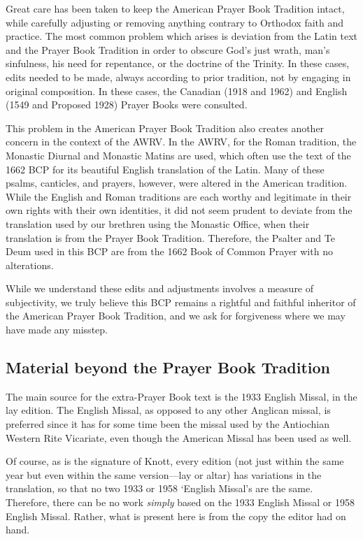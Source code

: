 Great care has been taken to keep the American Prayer Book Tradition intact, while carefully adjusting or removing anything contrary to Orthodox faith and practice. The most common problem which arises is deviation from the Latin text and the Prayer Book Tradition in order to obscure God's just wrath, man's sinfulness, his need for repentance, or the doctrine of the Trinity. In these cases, edits needed to be made, always according to prior tradition, not by engaging in original composition. In these cases, the Canadian (1918 and 1962) and English (1549 and Proposed 1928) Prayer Books were consulted.

This problem in the American Prayer Book Tradition also creates another concern in the context of the AWRV. In the AWRV, for the Roman tradition, the Monastic Diurnal and Monastic Matins are used, which often use the text of the 1662 BCP for its beautiful English translation of the Latin. Many of these psalms, canticles, and prayers, however, were altered in the American tradition. While the English and Roman traditions are each worthy and legitimate in their own rights with their own identities, it did not seem prudent to deviate from the translation used by our brethren using the Monastic Office, when their translation is from the Prayer Book Tradition. Therefore, the Psalter and Te Deum used in this BCP are from the 1662 Book of Common Prayer with no alterations.

While we understand these edits and adjustments involves a measure of subjectivity, we truly believe this BCP remains a rightful and faithful inheritor of the American Prayer Book Tradition, and we ask for forgiveness where we may have made any misstep.

\subsection{Material beyond the Prayer Book Tradition}\par\noindent
The main source for the extra-Prayer Book text is the 1933 English Missal, in the lay edition. The English Missal, as opposed to any other Anglican missal, is preferred since it has for some time been the missal used by the Antiochian Western Rite Vicariate, even though the American Missal has been used as well.

Of course, as is the signature of Knott, every edition (not just within the same year but even within the same version---lay or altar) has variations in the translation, so that no two 1933 or 1958 `English Missal's are the same. Therefore, there can be no work \textit{simply} based on the 1933 English Missal or 1958 English Missal. Rather, what is present here is from the copy the editor had on hand.

